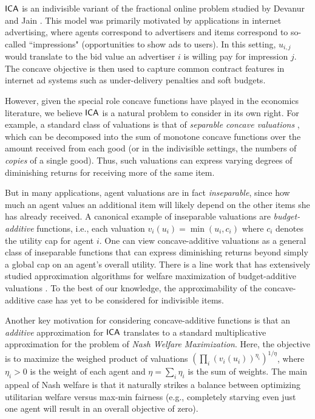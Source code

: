 \vspace{3mm} 
 $\mathsf{ICA}$ is an indivisible variant of the fractional online problem studied by Devanur and Jain \cite{devanur2012online}. This model was primarily motivated by applications in internet advertising, where agents correspond to advertisers and items correspond to so-called ``impressions" (opportunities to show ads to users). In this setting, $u_{i,j}$ would  translate to the bid value an advertiser $i$ is willing pay for impression $j$.  The concave objective is then used to capture common contract features in internet ad systems such as under-delivery penalties and soft budgets. 

However, given the special role concave functions have played in the economics literature, we believe $\mathsf{ICA}$ is a natural problem to consider in its own right. 
For example, a standard class of valuations is that of {\em separable concave valuations} \cite{anari2018nash, chaudhury2018fair, chen2009settling, vazirani2011market}, which can be decomposed into the sum of monotone concave functions over the amount received from each good (or in the indivisible settings, the numbers of {\em copies} of a single good).
Thus, such valuations can  express varying degrees of diminishing returns for receiving more of the same item. 

But in many applications, agent valuations are in fact {\em inseparable}, since how much an agent values an additional item will likely depend on the other items she has already received. 
A canonical example of inseparable valuations are {\em budget-additive} functions, i.e., each valuation $v_i(u_i) = \min\left(u_i, c_i\right)$ where $c_i$ denotes the utility cap for agent $i$. 
One can view concave-additive valuations as a general class of inseparable functions that can express diminishing returns beyond simply a global cap on an agent's overall utility. 
There is a line work that has extensively studied approximation algorithms for welfare maximization of budget-additive valuations \cite{garg2001approximation, andelman2004auctions, azar2008improved, chakrabarty2010approximability, kalaitzis2015configuration}. To the best of our knowledge, the approximability of the concave-additive case has yet to be considered for indivisible items. 

\vspace{3mm} 
 Another key motivation for considering concave-additive functions is that an {\em additive} approximation for $\mathsf{ICA}$
translates to a standard multiplicative approximation for the problem of {\em Nash Welfare Maximization}. 
Here, the objective is to maximize the weighed product of valuations $\left(\prod_i (v_i(u_i))^{\eta_i}\right)^{1/\eta}$, where $\eta_i > 0$ is the weight of each agent and $\eta = \sum_i \eta_i$ is the sum of weights.  
The main appeal of Nash welfare is that it naturally strikes a balance between optimizing utilitarian welfare versus max-min fairness (e.g., completely starving even just one agent will result in an overall objective of zero).

